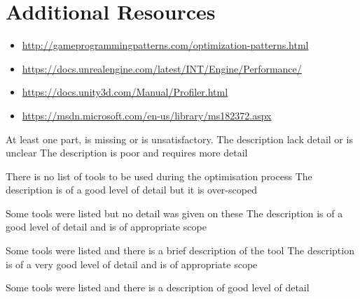 \documentclass{../../fal_assignment}
\begin{document}
\section*{Additional Resources}

\begin{itemize}
    \item \url{http://gameprogrammingpatterns.com/optimization-patterns.html}
    \item \url{https://docs.unrealengine.com/latest/INT/Engine/Performance/}
    \item \url{https://docs.unity3d.com/Manual/Profiler.html}
    \item \url{https://msdn.microsoft.com/en-us/library/ms182372.aspx}
\end{itemize}

\rubricyeartwo
\begin{markingrubric}
		\grade\fail At least one part, is missing or is unsatisfactory.
%
        \grade \fail The description lack detail or is unclear
        \grade The description is poor and requires more detail
            \par There is no list of tools to be used during the optimisation process
        \grade The description is of a good level of detail but it is over-scoped 
            \par Some tools were listed but no detail was given on these
        \grade The description is of a good level of detail and is of appropriate scope
            \par Some tools were listed and there is a brief description of the tool
        \grade The description is of a very good level of detail and is of appropriate scope
            \par Some tools were listed and there is a description of good level of detail

\end{markingrubric}
\end{document}
